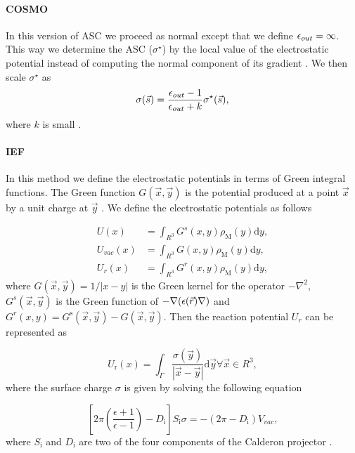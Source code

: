 \documentclass[../master_thesis.tex]{subfiles}
\begin{document}
\paragraph{\ac{COSMO}}
In this version of \ac{ASC} we proceed as normal except that we define $\epsilon_{out} = \infty$.
This way we determine the \ac{ASC} ($\sigma^{\star}$) by the local value of the electrostatic
potential instead of computing the normal component of its gradient \cite{Tomasi:2005ipa}.
We then scale $\sigma^{\star}$ as
\begin{equation}
  \sigma(\vec{s}) = \frac{\epsilon_{out} -1}{\epsilon_{out} + k}\sigma^{\star}(\vec{s}),
\end{equation}
where $k$ is small \cite{Tomasi:2005ipa}.

\paragraph{\ac{IEF}}
In this method we define the electrostatic potentials in terms of Green integral
functions. The Green function $G(\vec{x}, \vec{y})$ is the potential produced at
a point $\vec{x}$ by a unit charge at $\vec{y}$ \cite{Tomasi:2005ipa}. We define
the electrostatic potentials as follows

\begin{equation}
\begin{aligned} U(x) &=\int_{R^{3}} G^{s}(x, y) \rho_{\mathrm{M}}(y) \mathrm{d} y, \\
  U_{vac}(x) &=\int_{R^{3}} G(x, y) \rho_{\mathrm{M}}(y) \mathrm{d} y, \\
  U_{r}(x) &=\int_{R^{3}} G^{r}(x, y) \rho_{\mathrm{M}}(y) \mathrm{d} y, \end{aligned}
\end{equation}
where $G(\vec{x}, \vec{y})=1 /|x-y|$ is the Green kernel for the operator
$-\nabla^2$, $G^s(\vec{x}, \vec{y})$  is the Green function of
$-\nabla(\epsilon(\vec{r})\nabla)$ and $G^{r}(x, y)=G^{\mathrm{s}}(\vec{x},
\vec{y})-G(\vec{x}, \vec{y})$. Then the reaction potential $U_r$ can be represented
as  \cite{Tomasi:2005ipa}

\begin{equation}
U_{\mathrm{r}}(x)=\int_{\Gamma} \frac{\sigma(\vec{y})}{|\vec{x}-\vec{y}|}
\mathrm{d} \vec{y} \forall \vec{x} \in R^{3},
\end{equation}
where the surface charge $\sigma$ is given by solving the following equation

\begin{equation}
\left[2 \pi\left(\frac{\epsilon+1}{\epsilon-1}\right)-D_{\mathrm{i}}\right] S_{\mathrm{i}} \sigma=-\left(2 \pi-D_{\mathrm{i}}\right) V_{vac},
\end{equation}
where $S_{\mathrm{i}}$ and  $D_{\mathrm{i}}$ are two of the four components of the Calderon projector \cite{Tomasi:2005ipa}.
\end{document}
